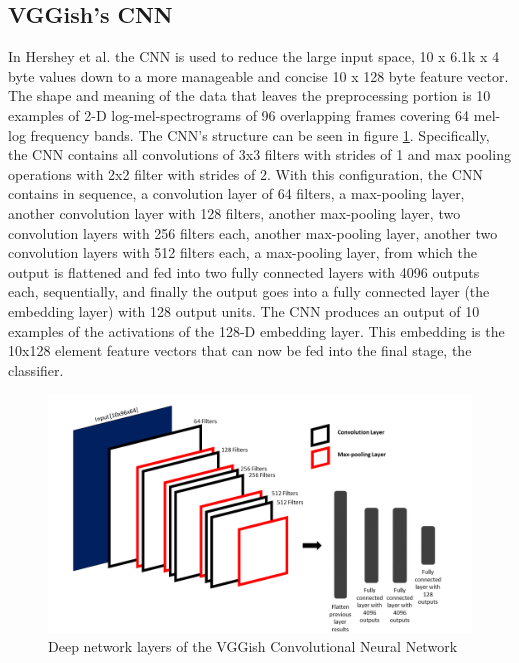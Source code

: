 \documentclass{article}
\begin{document}
\subsection{VGGish’s CNN}\label{sec:vggishscnn}

In Hershey et al.\cite{hershey} the CNN is used to reduce the large input space, 10 x 6.1k x 4 byte values down to a more manageable and concise 10 x 128 byte feature vector. The shape and meaning of the data that leaves the preprocessing portion is 10 examples of 2-D log-mel-spectrograms of 96 overlapping frames covering 64 mel-log frequency bands.  
The CNN’s structure can be seen in figure \ref{fig:vggish_cnn}.  Specifically, the CNN contains all convolutions of 3x3 filters with strides of 1 and max pooling operations with 2x2 filter with strides of 2. With this configuration, the CNN contains in sequence, a convolution layer of 64 filters, a max-pooling layer, another convolution layer with 128 filters, another max-pooling layer, two convolution layers with 256 filters each, another max-pooling layer, another two convolution layers with 512 filters each, a max-pooling layer, from which the output is flattened and fed into two fully connected layers with 4096 outputs each, sequentially, and finally the output goes into a fully connected layer (the embedding layer) with 128 output units.
The CNN produces an output of 10 examples of the activations of the 128-D embedding layer.  This embedding is the 10x128 element feature vectors that can now be fed into the final stage, the classifier.

\begin{figure}[!htb]
	\centering
	\includegraphics[width=1.0\textwidth]{vggish_cnn_3.png}  
	\caption{Deep network layers of the VGGish Convolutional Neural Network}
	\label{fig:vggish_cnn}
\end{figure}
	
\end{document}
